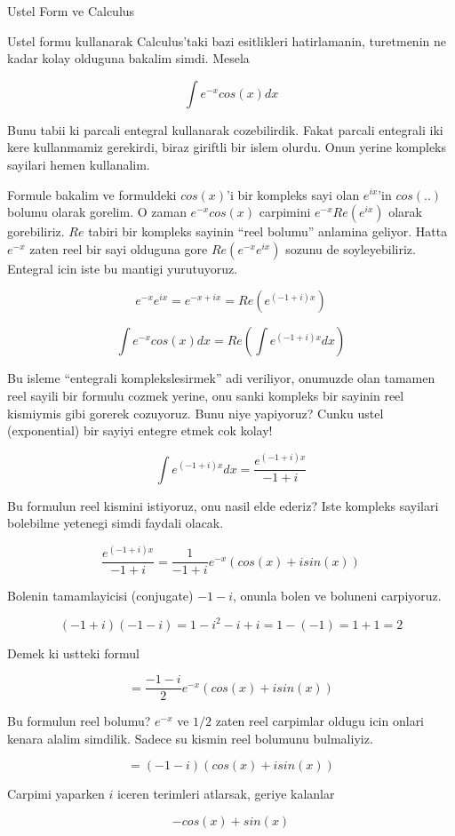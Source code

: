 \documentclass[12pt,fleqn]{article}
\begin{document}
Ustel Form ve Calculus

Ustel formu kullanarak Calculus'taki bazi esitlikleri hatirlamanin,
turetmenin ne kadar kolay olduguna bakalim simdi. Mesela

\[ \int e^{-x}cos(x) dx \]

Bunu tabii ki parcali entegral kullanarak cozebilirdik. Fakat parcali
entegrali iki kere kullanmamiz gerekirdi, biraz giriftli bir islem
olurdu. Onun yerine kompleks sayilari hemen kullanalim. 

Formule bakalim ve formuldeki $cos(x)$'i bir kompleks sayi olan $e^{ix}$'in
$cos(..)$ bolumu olarak gorelim. O zaman $e^{-x}cos(x)$ carpimini
$e^{-x}Re(e^{ix}) $ olarak gorebiliriz. $Re$ tabiri bir kompleks sayinin
``reel bolumu'' anlamina geliyor. Hatta $e^{-x}$ zaten reel bir sayi
olduguna gore $Re(e^{-x}e^{ix})$ sozunu de soyleyebiliriz. Entegral icin
iste bu mantigi yurutuyoruz.

\[ e^{-x}e^{ix} = e^{-x + ix} = Re(e^{(-1+i)x}) \]

\[ \int e^{-x}cos(x) dx = Re (\int e^{(-1+i)x} dx) \]

Bu isleme ``entegrali komplekslesirmek'' adi veriliyor, onumuzde olan
tamamen reel sayili bir formulu cozmek yerine, onu sanki kompleks bir
sayinin reel kismiymis gibi gorerek cozuyoruz. Bunu niye yapiyoruz? Cunku
ustel (exponential) bir sayiyi entegre etmek cok kolay!

\[ \int e^{(-1+i)x} dx = \frac{e^{(-1+i)x}}{-1+i}\]

Bu formulun reel kismini istiyoruz, onu nasil elde ederiz? Iste kompleks
sayilari bolebilme yetenegi simdi faydali olacak.

\[  \frac{e^{(-1+i)x}}{-1+i} = \frac{1}{-1+i} e^{-x}(cos(x) + isin(x))\]

Bolenin tamamlayicisi (conjugate) $-1-i$, onunla bolen ve boluneni
carpiyoruz.

\[ (-1+i)(-1-i) = 1-i^2-i+i = 1-(-1) = 1+1 = 2\]

Demek ki ustteki formul

\[ = \frac{-1-i}{2} e^{-x}(cos(x) + isin(x)) \]

Bu formulun reel bolumu? $e^{-x}$ ve $1/2$ zaten reel carpimlar oldugu icin
onlari kenara alalim simdilik. Sadece su kismin reel bolumunu bulmaliyiz.

\[ = (-1-i)(cos(x) + isin(x)) \]

Carpimi yaparken $i$ iceren terimleri atlarsak, geriye kalanlar

\[ -cos(x) + sin(x) \]
\end{document}
